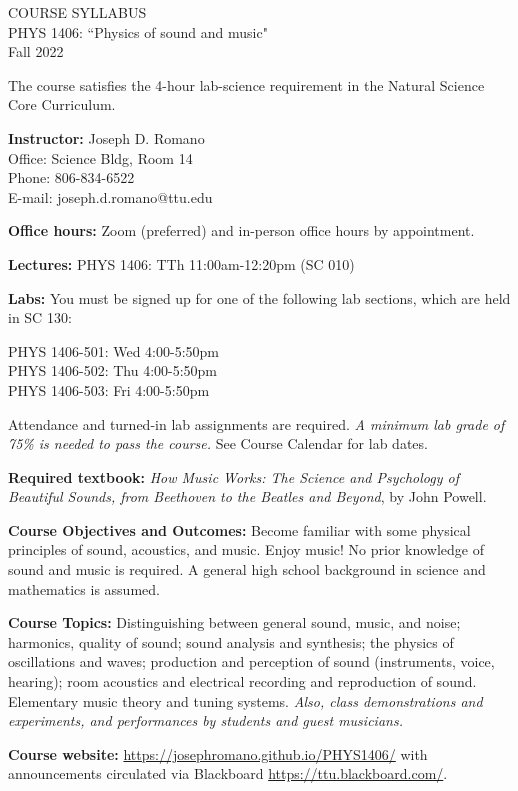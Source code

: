 \documentclass[11pt]{NSF}
\begin{document}
\begin{center}
COURSE SYLLABUS\\
PHYS 1406: ``Physics of sound and music"\\
Fall 2022
\end{center}

The course satisfies the 4-hour lab-science requirement in the Natural Science Core Curriculum.

{\bf Instructor:}
Joseph D. Romano\\
Office: Science Bldg, Room 14\\
Phone: 806-834-6522\\
E-mail: joseph.d.romano@ttu.edu

{\bf Office hours:}
Zoom (preferred) and in-person office hours by appointment.

{\bf Lectures:}
PHYS 1406: TTh 11:00am-12:20pm (SC 010)

{\bf Labs:} You must be signed up for one of the following lab
sections, which are held in SC 130:

PHYS 1406-501: Wed 4:00-5:50pm\\
PHYS 1406-502: Thu 4:00-5:50pm\\
PHYS 1406-503: Fri 4:00-5:50pm

Attendance and turned-in lab assignments are required.
\emph{A minimum lab grade of 75\% is needed to pass the course.}
See Course Calendar for lab dates.

{\bf Required textbook:}
{\em How Music Works: The Science and Psychology of Beautiful Sounds, 
from Beethoven to the Beatles and Beyond}, by John Powell.

{\bf Course Objectives and Outcomes:}
Become familiar with some physical principles of sound, acoustics, and music. 
Enjoy music!
No prior knowledge of sound and music is required. 
A general high school background in science and mathematics is assumed.

{\bf Course Topics:} 
Distinguishing between general sound, music, and noise;
harmonics, quality of sound; sound analysis and synthesis;
the physics of oscillations and waves;
production and perception of sound (instruments, voice, hearing);
room acoustics and electrical recording and reproduction of sound.
Elementary music theory and tuning systems.
{\em Also, class demonstrations and experiments, and performances by 
students and guest musicians.}

{\bf Course website:}
\url{https://josephromano.github.io/PHYS1406/} with announcements
circulated via Blackboard \url{https://ttu.blackboard.com/}.
\end{document}
